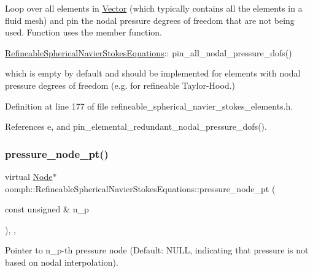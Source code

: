 Loop over all elements in \hyperlink{classoomph_1_1Vector}{Vector} (which typically contains all the elements in a fluid mesh) and pin the nodal pressure degrees of freedom that are not being used. Function uses the member function. 


\begin{DoxyItemize}
\item {\ttfamily \hyperlink{classoomph_1_1RefineableSphericalNavierStokesEquations}{Refineable\+Spherical\+Navier\+Stokes\+Equations}\+:}\+: pin\+\_\+all\+\_\+nodal\+\_\+pressure\+\_\+dofs()
\end{DoxyItemize}which is empty by default and should be implemented for elements with nodal pressure degrees of freedom (e.\+g. for refineable Taylor-\/\+Hood.) 

Definition at line 177 of file refineable\+\_\+spherical\+\_\+navier\+\_\+stokes\+\_\+elements.\+h.



References e, and pin\+\_\+elemental\+\_\+redundant\+\_\+nodal\+\_\+pressure\+\_\+dofs().

\mbox{\label{classoomph_1_1RefineableSphericalNavierStokesEquations_a1daddea2d11bb46db3e6aef3843b288d}} 
\subsubsection{\texorpdfstring{pressure\+\_\+node\+\_\+pt()}{pressure\_node\_pt()}}
{\footnotesize\ttfamily virtual \hyperlink{classoomph_1_1Node}{Node}$\ast$ oomph\+::\+Refineable\+Spherical\+Navier\+Stokes\+Equations\+::pressure\+\_\+node\+\_\+pt (\begin{DoxyParamCaption}\item[{const unsigned \&}]{n\+\_\+p }\end{DoxyParamCaption})\hspace{0.3cm}{\ttfamily [inline]}, {\ttfamily [protected]}, {\ttfamily [virtual]}}



Pointer to n\+\_\+p-\/th pressure node (Default\+: N\+U\+LL, indicating that pressure is not based on nodal interpolation). 



